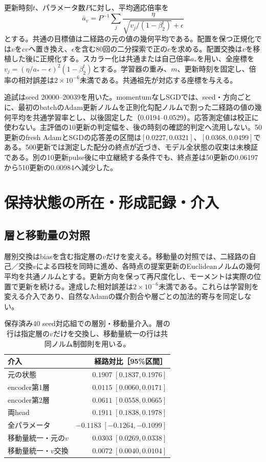 更新時刻$t$、パラメータ数$P$に対し、平均適応倍率を
\begin{equation}\bar a_v=P^{-1}\sum_j\frac{\eta}{\sqrt{v_j/(1-\beta_2^t)}+\epsilon}\end{equation}
とする。共通の目標値は二経路の元の値の幾何平均である。配置を保つ正規化では$v$を$cv$へ置き換え、$\epsilon$を含む80回の二分探索で正の$c$を求める。配置交換は$v$を移植した後に正規化する。スカラー化は共通または自己倍率$a_\ast$を用い、全座標を$v_j=(\eta/a_\ast-\epsilon)^2(1-\beta_2^t)$とする。学習器の重み、$m$、更新時刻を固定し、倍率の相対誤差は$2\times10^{-6}$未満である。共通祖先が対応する座標を与える。

追試はseed 20000--20039を用いた。momentumなしSGDでは、seed・方向ごとに、最初のbatchのAdam更新ノルムを正則化勾配ノルムで割った二経路の値の幾何平均を共通学習率とし、以後固定した（0.0194--0.0529）。応答測定値は校正に使わない。主評価の10更新の判定幅を、後の時刻の確認的判定へ流用しない。50更新のfresh AdamとSGDの応答差の区間は$[0.0227,0.0321]$、$[0.0368,0.0499]$である。500更新では測定した配分の終点が近づき、モデル全状態の収束は未検証である。別の10更新pulse後に中立継続する条件でも、終点差は50更新の0.06197から510更新の0.00984へ減少した。

\section{保持状態の所在・形成記録・介入}
\label{app:mechanism}
\subsection{層と移動量の対照}
\label{app:layers}
層別交換はbiasを含む指定層の$v$だけを変える。移動量の対照では、二経路の自己／交換$v$による四枝を同時に進め、各時点の提案更新のEuclideanノルムの幾何平均を共通ノルムとする。更新方向を保って再尺度化し、モーメントは実際の位置で更新を続ける。達成した相対誤差は$2\times10^{-6}$未満である。これらは学習則を変える介入であり、自然なAdamの媒介割合や層ごとの加法的寄与を同定しない。

\begin{table}[H]
\centering\small
\caption{保存済み40 seed対応組での層別・移動量介入。層の行は指定層の$v$だけを交換し、移動量統一の行は共同ノルム制御則を用いる。}
\label{tab:ivfmechanism}
\begin{tabular}{lr}
\toprule
介入 & 経路対比［95\%区間］\\
\midrule
元の状態 & $0.1907\;[0.1837,0.1976]$ \\
encoder第1層 & $0.0115\;[0.0060,0.0171]$ \\
encoder第2層 & $0.0611\;[0.0558,0.0665]$ \\
両head & $0.1911\;[0.1838,0.1978]$ \\
全パラメータ & $-0.1183\;[-0.1264,-0.1099]$ \\
移動量統一・元の$v$ & $0.0303\;[0.0269,0.0338]$ \\
移動量統一・$v$交換 & $0.0072\;[0.0040,0.0104]$ \\
\bottomrule
\end{tabular}

\end{table}

